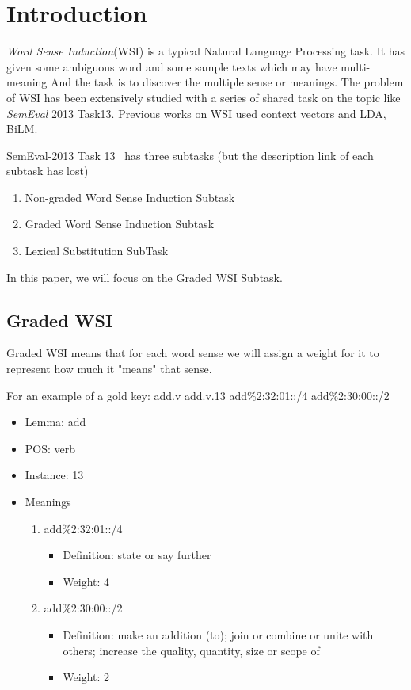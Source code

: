 \section{Introduction}
\label{sec:introduction}

\emph{Word Sense Induction}(WSI) is a typical Natural Language Processing task.
It has given some ambiguous word and some sample texts which may have multi-meaning
And the task is to discover the multiple sense or meanings.
The problem of WSI has been extensively studied with a series of shared task on the topic like \emph{SemEval} 2013 Task13.
Previous works on WSI used context vectors and LDA, BiLM.

SemEval-2013 Task 13~\cite{jurgens2013semeval} has three subtasks (but the description link of each subtask has lost)

\begin{enumerate}
    \item Non-graded Word Sense Induction Subtask
    \item Graded Word Sense Induction Subtask
    \item Lexical Substitution SubTask
\end{enumerate}

In this paper, we will focus on the Graded WSI Subtask.

\subsection*{Graded WSI}

Graded WSI means that for each word sense we will assign a weight for it to represent how much it "means" that sense.

For an example of a gold key: add.v add.v.13 add\%2:32:01::/4 add\%2:30:00::/2

\begin{itemize}
    \item Lemma: add
    \item POS: verb
    \item Instance: 13
    \item Meanings
        \begin{enumerate}
            \item add\%2:32:01::/4
                \begin{itemize}
                    \item Definition: state or say further
                    \item Weight: 4
                \end{itemize}
            \item add\%2:30:00::/2
                \begin{itemize}
                    \item Definition: make an addition (to); join or combine or unite with others; increase the quality, quantity, size or scope of
                    \item Weight: 2
                \end{itemize}
        \end{enumerate}
\end{itemize}

